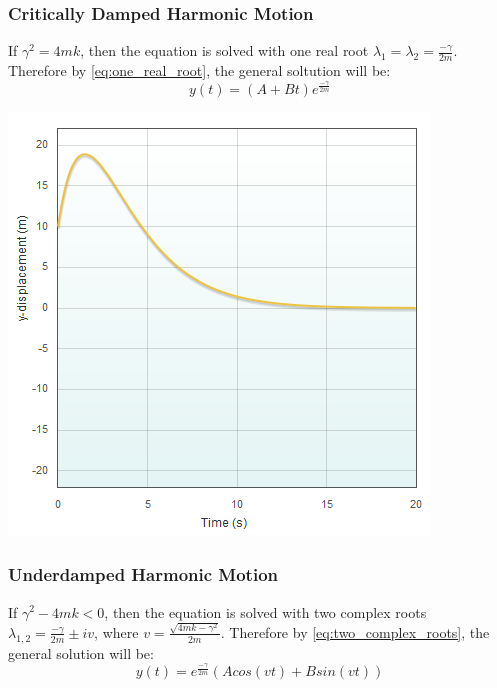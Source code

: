\documentclass[11pt]{article} %
\newenvironment{Figure}
  {\par\medskip\noindent\minipage{\linewidth}}
  {\endminipage\par\medskip}
\begin{document}
\begin{multicols}{2}
\subsubsection {Critically Damped Harmonic Motion}
If ${\gamma}^2 = 4mk$, then the equation is solved with one real root ${\lambda}_1 = {\lambda}_2 = \frac{-\gamma}{2m}$. Therefore by \eqref{eq:one_real_root}, the general soltution will be:
\begin{equation}
y(t) = (A + Bt)e^{{\frac{-\gamma}{2m}}}	
\end{equation}

\begin{Figure}
 \centering
 \includegraphics[width=\linewidth]{critically_damped_free.png}
\end{Figure}

\subsubsection {Underdamped Harmonic Motion}
If ${\gamma}^2 - 4mk < 0$, then the equation is solved with two complex roots ${\lambda}_{1,2} = \frac{-\gamma}{2m} \pm iv$, where $v = \frac{\sqrt{4mk - {\gamma}^2}}{2m}$. Therefore by \eqref{eq:two_complex_roots}, the general solution will be:
\begin{equation}
y(t) = e^{{\frac{-\gamma}{2m}}}(Acos(vt) + Bsin(vt))
\end{equation}


\end{multicols}
\end{document}
